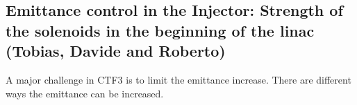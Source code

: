 
\subsection{Emittance control in the Injector: Strength of the solenoids in the beginning of the linac \textbf{(Tobias, Davide and Roberto)}}

A major challenge in CTF3 is to limit the emittance increase. There are different ways the emittance can be increased. 





